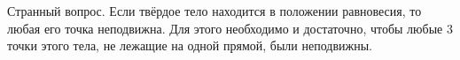 
Странный вопрос. Если твёрдое тело находится в положении равновесия, то любая
его точка неподвижна. Для этого необходимо и достаточно, чтобы любые 3 точки
этого тела, не лежащие на одной прямой, были неподвижны.

\newpage
